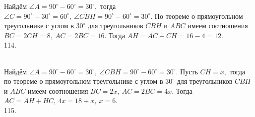 \documentclass[12pt]{article}
\begin{document}
Найдём $\angle A=90^\circ-60^\circ=30^\circ,$ тогда $\angle C=90^\circ-30^\circ=60^\circ,\ \angle CBH=90^\circ-60^\circ=30^\circ.$ По теореме о прямоугольном треугольнике с углом в $30^\circ$ для треугольников $CBH$ и $ABC$ имеем соотношения $BC=2CH=8,\ AC=2BC=16.$ Тогда $AH=AC-CH=16-4=12.$\\
114. \begin{figure}[ht!]
\end{figure}\\
Найдём $\angle A=90^\circ-60^\circ=30^\circ,\ \angle CBH=90^\circ-60^\circ=30^\circ.$ Пусть $CH=x,$ тогда по теореме о прямоугольном треугольнике с углом в $30^\circ$ для треугольников $CBH$ и $ABC$ имеем соотношения $BC=2x,\ AC=2BC=4x.$ Тогда $AC=AH+HC,\ 4x=18+x,\ x=6.$\\
115. \begin{figure}[ht!]
\end{figure}\\
\end{document}
